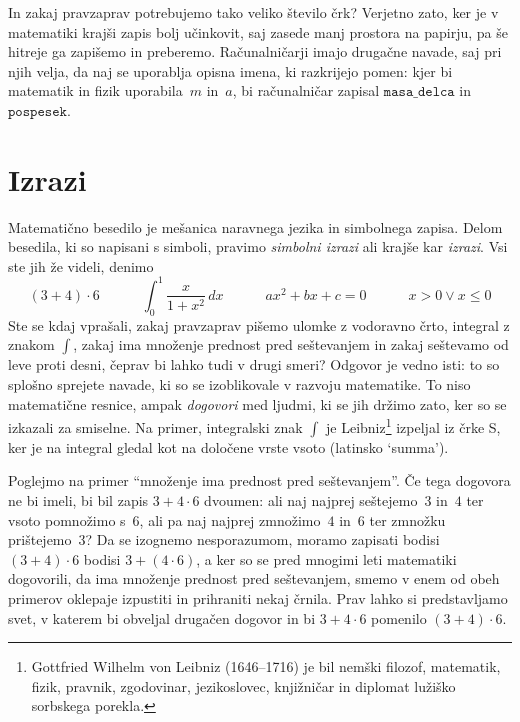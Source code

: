 In zakaj pravzaprav potrebujemo tako veliko število črk? Verjetno zato, ker je v
matematiki krajši zapis bolj učinkovit, saj zasede manj prostora na papirju, pa še hitreje
ga zapišemo in preberemo. Računalničarji imajo drugačne navade, saj pri njih velja, da naj
se uporablja opisna imena, ki razkrijejo pomen: kjer bi matematik in fizik uporabila~$m$
in~$a$, bi računalničar zapisal $\mathtt{masa\_delca}$ in $\mathtt{pospesek}$.

\section{Izrazi}
\label{sec:irazi}

Matematično besedilo je mešanica naravnega jezika in simbolnega zapisa. Delom besedila, ki
so napisani s simboli, pravimo \emph{simbolni izrazi} ali krajše kar \emph{izrazi}. Vsi
ste jih že videli, denimo
%
\begin{equation*}
  (3 + 4) \cdot 6 \qquad\quad
  \int_0^1 \frac{x}{1 + x^2} \, dx \qquad\quad
  a x^2 + b x + c = 0 \qquad\quad
  x > 0 \lor x \leq 0
\end{equation*}
%
Ste se kdaj vprašali, zakaj pravzaprav pišemo ulomke z vodoravno črto, integral z znakom
$\int$, zakaj ima množenje prednost pred seštevanjem in zakaj seštevamo od leve proti
desni, čeprav bi lahko tudi v drugi smeri? Odgovor je vedno isti: to so splošno sprejete
navade, ki so se izoblikovale v razvoju matematike. To niso matematične resnice, ampak
\emph{dogovori} med ljudmi, ki se jih držimo zato, ker so se izkazali za smiselne. Na
primer, integralski znak $\int$ je Leibniz\footnote{Gottfried Wilhelm von Leibniz
  (1646--1716) je bil nemški filozof, matematik, fizik, pravnik, zgodovinar, jezikoslovec,
  knjižničar in diplomat lužiško sorbskega porekla.} izpeljal iz črke S, ker je na
integral gledal kot na določene vrste vsoto (latinsko `summa').

Poglejmo na primer ``množenje ima prednost pred seštevanjem''. Če tega dogovora ne bi
imeli, bi bil zapis $3 + 4 \cdot 6$ dvoumen: ali naj najprej seštejemo~$3$ in~$4$ ter
vsoto pomnožimo s~$6$, ali pa naj najprej zmnožimo~$4$ in~$6$ ter zmnožku prištejemo~$3$?
Da se izognemo nesporazumom, moramo zapisati bodisi $(3 + 4) \cdot 6$ bodisi
$3 + (4 \cdot 6)$, a ker so se pred mnogimi leti matematiki dogovorili, da ima množenje
prednost pred seštevanjem, smemo v enem od obeh primerov oklepaje izpustiti in prihraniti
nekaj črnila. Prav lahko si predstavljamo svet, v katerem bi obveljal drugačen dogovor in
bi $3 + 4 \cdot 6$ pomenilo $(3 + 4) \cdot 6$.

